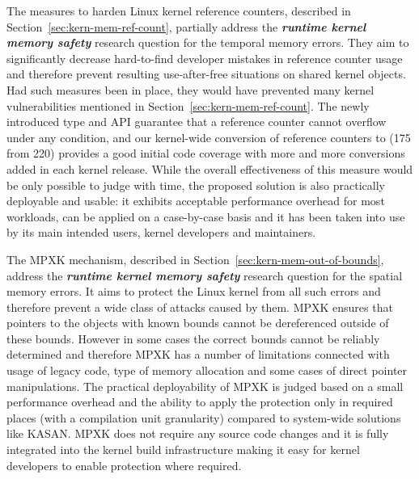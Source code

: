 The measures to harden Linux kernel reference counters, described in Section~\ref{sec:kern-mem-ref-count}, partially address the \textbf{\textit{runtime kernel memory safety}} research question for the temporal memory errors. They aim to significantly decrease hard-to-find developer mistakes in reference counter usage and therefore prevent resulting use-after-free situations on shared kernel objects. Had such measures been in place, they would have prevented many kernel vulnerabilities mentioned in Section~\ref{sec:kern-mem-ref-count}. The newly introduced  type and API guarantee that a reference counter cannot overflow under any condition, and our kernel-wide conversion of reference counters to  (175 from 220) provides a good initial code coverage with more and more conversions added in each kernel release. While the overall effectiveness of this measure would be only possible to judge with time, the proposed solution is also practically deployable and usable: it exhibits acceptable performance overhead for most workloads, can be applied on a case-by-case basis and it has been taken into use by its main intended users, kernel developers and maintainers. 

The MPXK mechanism, described in Section~\ref{sec:kern-mem-out-of-bounds}, address the \textbf{\textit{runtime kernel memory safety}} research question for the spatial memory errors. It aims to protect the Linux kernel from all such errors and therefore prevent a wide class of attacks caused by them. MPXK ensures that pointers to the objects with known bounds cannot be dereferenced outside of these bounds. However in some cases the correct bounds cannot be reliably determined and therefore MPXK has a number of limitations connected with usage of legacy code, type of memory allocation and some cases of direct pointer manipulations. The practical deployability of MPXK is judged based on a small performance overhead and the ability to apply the protection only in required places (with a compilation unit granularity) compared to system-wide solutions like KASAN. MPXK does not require any source code changes and it is fully integrated into the kernel build infrastructure making it easy for kernel developers to enable protection where required.  

